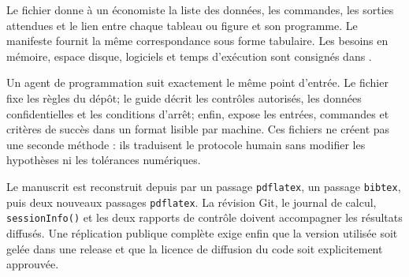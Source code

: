 \documentclass[11pt,a4paper]{article}
\begin{document}
Le fichier  donne à un économiste la liste
des données, les commandes, les sorties attendues et le lien entre chaque
tableau ou figure et son programme. Le manifeste
 fournit la même correspondance sous
forme tabulaire. Les besoins en mémoire, espace disque, logiciels et temps
d'exécution sont consignés dans
.

Un agent de programmation suit exactement le même point d'entrée. Le fichier
 fixe les règles du dépôt; le guide
 décrit les contrôles autorisés, les
données confidentielles et les conditions d'arrêt; enfin,
 expose les entrées, commandes
et critères de succès dans un format lisible par machine. Ces fichiers ne créent
pas une seconde méthode : ils traduisent le protocole humain sans modifier les
hypothèses ni les tolérances numériques.

Le manuscrit est reconstruit depuis
 par un passage \texttt{pdflatex}, un
passage \texttt{bibtex}, puis deux nouveaux passages \texttt{pdflatex}. La
révision Git, le journal de calcul, \texttt{sessionInfo()} et les deux rapports
de contrôle doivent accompagner les résultats diffusés. Une réplication publique
complète exige enfin que la version utilisée soit gelée dans une release et que
la licence de diffusion du code soit explicitement approuvée.
\end{document}
